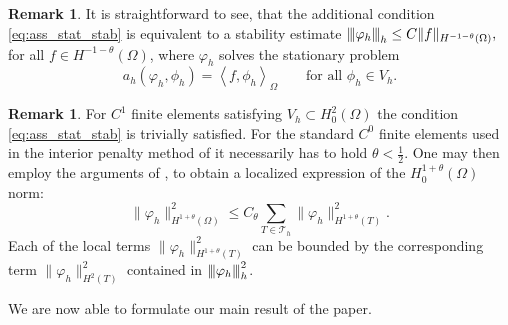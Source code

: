 \documentclass{m2an}
\newcommand{\1}{\mathds{1}}
\newcommand{\Om}{\Omega}
\newcommand{\vertiii}[1]{{\left\vert\kern-0.25ex\left\vert\kern-0.25ex\left\vert #1
    \right\vert\kern-0.25ex\right\vert\kern-0.25ex\right\vert}}
\newcommand{\Opair}[1]{\left\langle#1\right\rangle_{\Omega}}
\theoremstyle{definition}
\newtheorem{remark}[theorem]{Remark}
\begin{document}
\begin{remark}
  It is straightforward to see, that the additional condition \eqref{eq:ass_stat_stab} is equivalent to 
  a stability estimate 
  $
    \vertiii{\varphi_h}_h \le C \|f\|_{H^{-1-\theta}(\Om)},
    $
  for all $f \in H^{-1-\theta}(\Om)$, where $\varphi_h$ solves the stationary problem
  \begin{equation}
    a_h(\varphi_h,\phi_h) = \Opair{f,\phi_h} \qquad \text{for all } \phi_h \in V_h.
  \end{equation}
\end{remark}
\begin{remark}
  For $C^1$ finite elements satisfying $V_h \subset H^2_0(\Om)$ the condition \eqref{eq:ass_stat_stab} 
  is trivially satisfied.
  For the standard $C^0$ finite elements used in the interior penalty method of 
  \cite{BrennerS_SungLY_2005} it necessarily has to hold $\theta < \frac12$.
  One may then employ the arguments of \cite{belgacem_nonstandard_2001}, to obtain a localized expression
  of the $H^{1+\theta}_0(\Om)$ norm:
  \begin{equation*}
    \|\varphi_h\|_{H^{1+\theta}(\Om)}^2 \le C_\theta \sum_{T \in \mathcal T_h} \|\varphi_h\|_{H^{1+\theta}(T)}^2.
  \end{equation*}
  Each of the local terms $\|\varphi_h\|_{H^{1+\theta}(T)}^2$ can be bounded by the corresponding
  term $\|\varphi_h\|_{H^{2}(T)}^2$ contained in $\vertiii{\varphi_h}_h^2$.
\end{remark}
We are now able to formulate our main result of the paper.
\end{document}
